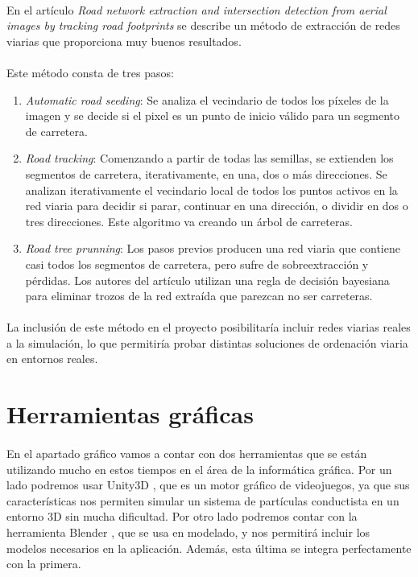 	\paragraph{}
	En el artículo \emph{Road network extraction and intersection detection from aerial images by tracking road footprints} \cite{JiuxiangHu2007} se describe un método de extracción de redes viarias que proporciona muy buenos resultados.
	
	\paragraph{}
	Este método consta de tres pasos:
	\begin{enumerate}	
	\item \emph{Automatic road seeding}: Se analiza el vecindario de todos los píxeles de la imagen y se decide si el pixel es un punto de inicio válido para un segmento de carretera.
	\item \emph{Road tracking}: Comenzando a partir de todas las semillas, se extienden los segmentos de carretera, iterativamente, en una, dos o más direcciones. Se analizan iterativamente el vecindario local de todos los puntos activos en la red viaria para decidir si parar, continuar en una dirección, o dividir en dos o tres direcciones. Este algoritmo va creando un árbol de carreteras.
	\item \emph{Road tree prunning}: Los pasos previos producen una red viaria que contiene casi todos los segmentos de carretera, pero sufre de sobreextracción y pérdidas. Los autores del artículo utilizan una regla de decisión bayesiana para eliminar trozos de la red extraída que parezcan no ser carreteras.
	\end{enumerate}
	
	\paragraph{}
	La inclusión de este método en el proyecto posibilitaría incluir redes viarias reales a la simulación, lo que permitiría probar distintas soluciones de ordenación viaria en entornos reales.

\section{Herramientas gráficas}

	\paragraph{}
	En el apartado gráfico vamos a contar con dos herramientas que se están utilizando mucho en estos tiempos en el área de la informática gráfica. Por un lado podremos usar Unity3D \cite{Unity_web}, que es un motor gráfico de videojuegos, ya que sus características nos permiten simular un sistema de partículas conductista en un entorno 3D sin mucha dificultad. Por otro lado podremos contar con la herramienta Blender \cite{Blender_web}, que se usa en modelado, y nos permitirá incluir los modelos necesarios en la aplicación. Además, esta última se integra perfectamente con la primera.
